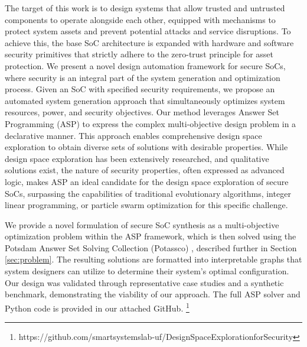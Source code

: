 The target of this work is to design systems that allow trusted and untrusted components to operate alongside each other, equipped with mechanisms to protect system assets and prevent potential attacks and service disruptions. To achieve this, the base SoC architecture is expanded with hardware and software security primitives that strictly adhere to the zero-trust principle for asset protection. We present a novel design automation framework for secure SoCs, where security is an integral part of the system generation and optimization process. Given an SoC with specified security requirements, we propose an automated system generation approach that simultaneously optimizes system resources, power, and security objectives. Our method leverages Answer Set Programming (ASP) to express the complex multi-objective design problem in a declarative manner. This approach enables comprehensive design space exploration to obtain diverse sets of solutions with desirable properties. While design space exploration has been extensively researched, and qualitative solutions exist, the nature of security properties, often expressed as advanced logic, makes ASP an ideal candidate for the design space exploration of secure SoCs, surpassing the capabilities of traditional evolutionary algorithms, integer linear programming, or particle swarm optimization for this specific challenge.

We provide a novel formulation of secure SoC synthesis as a multi-objective optimization problem within the ASP framework, which is then solved using the Potsdam Answer Set Solving Collection (Potassco) \cite{gebser_potassco_2011}, described further in Section \ref{sec:problem}. The resulting solutions are formatted into interpretable graphs that system designers can utilize to determine their system's optimal configuration. Our design was validated through representative case studies and a synthetic benchmark, demonstrating the viability of our approach. The full ASP solver and Python code is provided in our attached GitHub. \footnote{https://github.com/smartsystemslab-uf/DesignSpaceExplorationforSecurity}

 \vspace{-1pt}